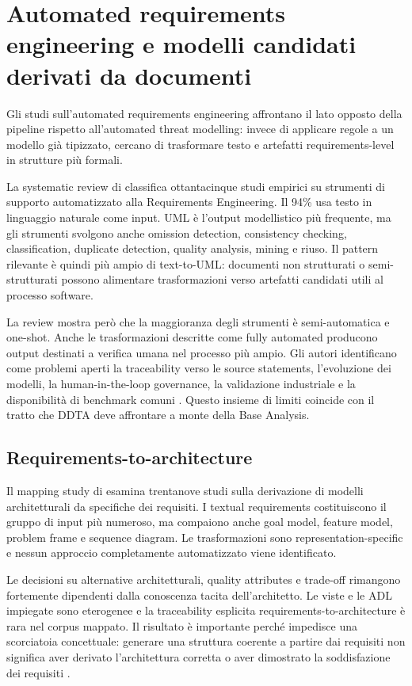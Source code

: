 \documentclass[12pt,a4paper,oneside]{report}
\begin{document}
\section{Automated requirements engineering e modelli candidati derivati da documenti}

Gli studi sull'automated requirements engineering affrontano il lato opposto della pipeline rispetto all'automated threat modelling: invece di applicare regole a un modello già tipizzato, cercano di trasformare testo e artefatti requirements-level in strutture più formali.

La systematic review di \citet{umar2024automatedrequirements} classifica ottantacinque studi empirici su strumenti di supporto automatizzato alla Requirements Engineering. Il 94\% usa testo in linguaggio naturale come input. UML è l'output modellistico più frequente, ma gli strumenti svolgono anche omission detection, consistency checking, classification, duplicate detection, quality analysis, mining e riuso. Il pattern rilevante è quindi più ampio di text-to-UML: documenti non strutturati o semi-strutturati possono alimentare trasformazioni verso artefatti candidati utili al processo software.

La review mostra però che la maggioranza degli strumenti è semi-automatica e one-shot. Anche le trasformazioni descritte come fully automated producono output destinati a verifica umana nel processo più ampio. Gli autori identificano come problemi aperti la traceability verso le source statements, l'evoluzione dei modelli, la human-in-the-loop governance, la validazione industriale e la disponibilità di benchmark comuni \citep{umar2024automatedrequirements}. Questo insieme di limiti coincide con il tratto che DDTA deve affrontare a monte della Base Analysis.

\subsection{Requirements-to-architecture}

Il mapping study di \citet{souza2019architecturalmodels} esamina trentanove studi sulla derivazione di modelli architetturali da specifiche dei requisiti. I textual requirements costituiscono il gruppo di input più numeroso, ma compaiono anche goal model, feature model, problem frame e sequence diagram. Le trasformazioni sono representation-specific e nessun approccio completamente automatizzato viene identificato.

Le decisioni su alternative architetturali, quality attributes e trade-off rimangono fortemente dipendenti dalla conoscenza tacita dell'architetto. Le viste e le ADL impiegate sono eterogenee e la traceability esplicita requirements-to-architecture è rara nel corpus mappato. Il risultato è importante perché impedisce una scorciatoia concettuale: generare una struttura coerente a partire dai requisiti non significa aver derivato l'architettura corretta o aver dimostrato la soddisfazione dei requisiti \citep{souza2019architecturalmodels}.
\end{document}
